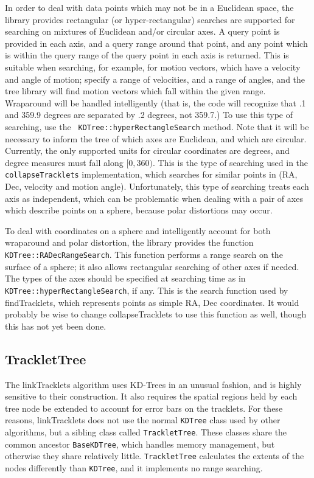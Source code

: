 In order to deal with data points which may not be in a Euclidean
space, the library provides rectangular (or hyper-rectangular)
searches are supported for searching on mixtures of Euclidean and/or
circular axes.  A query point is provided in each axis, and a query
range around that point, and any point which is within the query range
of the query point in each axis is returned.  This is suitable when
searching, for example, for motion vectors, which have a velocity and
angle of motion; specify a range of velocities, and a range of angles,
and the tree library will find motion vectors which fall within the
given range.  Wraparound will be handled intelligently (that is, the
code will recognize that .1 and 359.9 degrees are separated by .2
degrees, not 359.7.)  To use this type of searching, use the {\tt
KDTree::hyperRectangleSearch} method. Note that it will be necessary
to inform the tree of which axes are Euclidean, and which are
circular.  Currently, the only supported units for circular
coordinates are degrees, and degree measures must fall along $[0,
360)$.  This is the type of searching used in the {\tt
collapseTracklets} implementation, which searches for similar points
in (RA, Dec, velocity and motion angle).  Unfortunately, this type of
searching treats each axis as independent, which can be problematic
when dealing with a pair of axes which describe points on a sphere,
because polar distortions may occur.

To deal with coordinates on a sphere and intelligently account for
both wraparound and polar distortion, the library provides the
function {\tt KDTree::RADecRangeSearch}.  This function performs a
range search on the surface of a sphere; it also allows rectangular
searching of other axes if needed.  The types of the axes should be
specified at searching time as in {\tt KDTree::hyperRectangleSearch},
if any.  This is the search function used by findTracklets, which
represents points as simple RA, Dec coordinates.  It would probably be
wise to change collapseTracklets to use this function as well, though
this has not yet been done.


\subsection{TrackletTree}

The linkTracklets algorithm uses KD-Trees in an unusual fashion, and
is highly sensitive to their construction.  It also requires the
spatial regions held by each tree node be extended to account for
error bars on the tracklets.  For these reasons, linkTracklets does
not use the normal {\tt KDTree} class used by other algorithms, but a
sibling class called {\tt TrackletTree}.  These classes share the
common ancestor {\tt BaseKDTree}, which handles memory management, but
otherwise they share relatively little.  {\tt TrackletTree} calculates
the extents of the nodes differently than {\tt KDTree}, and it
implements no range searching.  

